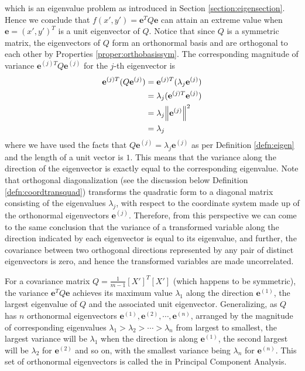which is an eigenvalue problem as introduced in Section \ref{section:eigensection}. Hence we conclude that $f(x',y') = \textbf{e}^T Q \textbf{e}$ can attain an extreme value when $\textbf{e} = (x',y')^T$ is a unit eigenvector of $Q$. Notice that since $Q$ is a symmetric matrix, the eigenvectors of $Q$ form an orthonormal basis and are orthogonal to each other by Properties \ref{proper:orthobasissym}. The corresponding magnitude of variance ${\textbf{e}^{(j)T}} Q \textbf{e}^{(j)}$ for the $j$-th eigenvector is
\begin{align}
\textbf{e}^{(j)T} (Q \textbf{e}^{(j)}) &= \textbf{e}^{(j)T} (\lambda_j \textbf{e}^{(j)}) \nonumber \\
&= \lambda_j (\textbf{e}^{(j)T} \textbf{e}^{(j)}) \nonumber \\
&= \lambda_j \norm{\textbf{e}^{(j)}}^2 \nonumber \\
&= \lambda_j 
\end{align}
where we have used the facts that $Q \textbf{e}^{(j)} = \lambda_j \textbf{e}^{(j)}$ as per Definition \ref{defn:eigen} and the length of a unit vector is $1$. This means that the variance along the direction of the eigenvector is exactly equal to the corresponding eigenvalue. Note that orthogonal diagonalization (see the discussion below Definition \ref{defn:coordtransquad}) transforms the quadratic form to a diagonal matrix consisting of the eigenvalues $\lambda_j$, with respect to the coordinate system made up of the orthonormal eigenvectors $\textbf{e}^{(j)}$. Therefore, from this perspective we can come to the same conclusion that the variance of a transformed variable along the direction indicated by each eigenvector is equal to its eigenvalue, and further, the covariance between two orthogonal directions represented by any pair of distinct eigenvectors is zero, and hence the transformed variables are made uncorrelated. 
\begin{thm}
\label{thm:PCA}
For a covariance matrix $Q = \frac{1}{m-1}[X']^T[X']$ (which happens to be symmetric), the variance $\textbf{e}^T Q \textbf{e}$ achieves its maximum value $\lambda_1$ along the direction $\textbf{e}^{(1)}$, the largest eigenvalue of $Q$ and the associated unit eigenvector. Generalizing, as $Q$ has $n$ orthonormal eigenvectors $\textbf{e}^{(1)}, \textbf{e}^{(2)}, \cdots, \textbf{e}^{(n)}$, arranged by the magnitude of corresponding eigenvalues $\lambda_1 > \lambda_2 > \cdots > \lambda_n$ from largest to smallest, the largest variance will be $\lambda_1$ when the direction is along $\textbf{e}^{(1)}$, the second largest will be $\lambda_2$ for $\textbf{e}^{(2)}$ and so on, with the smallest variance being $\lambda_n$ for $\textbf{e}^{(n)}$. This set of orthonormal eigenvectors is called the  in Principal Component Analysis.
\end{thm}
